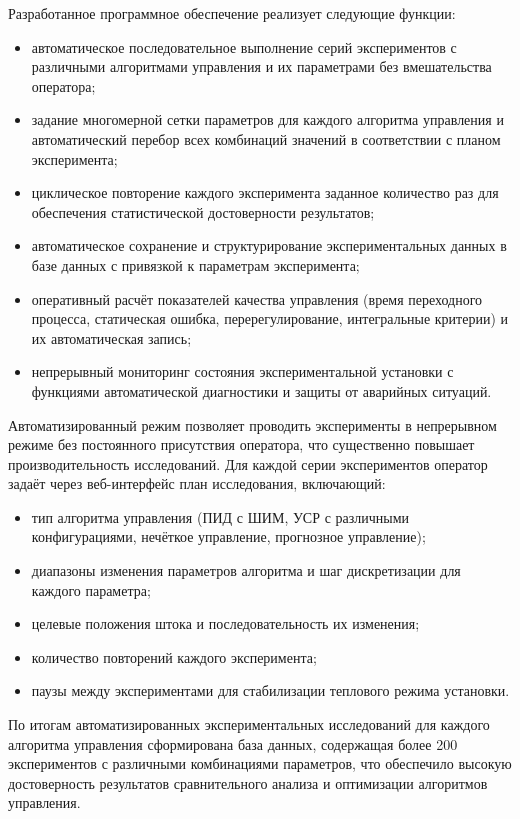 Разработанное программное обеспечение реализует следующие функции:
\begin{itemize}
	\item автоматическое последовательное выполнение серий экспериментов с различными алгоритмами управления
	      и их параметрами без вмешательства оператора;
	\item задание многомерной сетки параметров для каждого алгоритма управления и автоматический перебор
	      всех комбинаций значений в соответствии с планом эксперимента;
	\item циклическое повторение каждого эксперимента заданное количество раз для обеспечения
	      статистической достоверности результатов;
	\item автоматическое сохранение и структурирование экспериментальных данных в базе данных с
	      привязкой к параметрам эксперимента;
	\item оперативный расчёт показателей качества управления (время переходного процесса, статическая
	      ошибка, перерегулирование, интегральные критерии) и их автоматическая запись;
	\item непрерывный мониторинг состояния экспериментальной установки с функциями автоматической
	      диагностики и защиты от аварийных ситуаций.
\end{itemize}
Автоматизированный режим позволяет проводить эксперименты в непрерывном режиме без постоянного присутствия
оператора, что существенно повышает производительность исследований. Для каждой серии экспериментов оператор
задаёт через веб-интерфейс план исследования, включающий:
\begin{itemize}
	\item тип алгоритма управления (ПИД с ШИМ, УСР с различными конфигурациями, нечёткое управление,
	      прогнозное управление);
	\item диапазоны изменения параметров алгоритма и шаг дискретизации для каждого параметра;
	\item целевые положения штока и последовательность их изменения;
	\item количество повторений каждого эксперимента;
	\item паузы между экспериментами для стабилизации теплового режима установки.
\end{itemize}

По итогам автоматизированных экспериментальных исследований для каждого алгоритма управления сформирована база данных,
содержащая более 200 экспериментов с различными комбинациями параметров, что обеспечило высокую достоверность
результатов сравнительного анализа и оптимизации алгоритмов управления.

